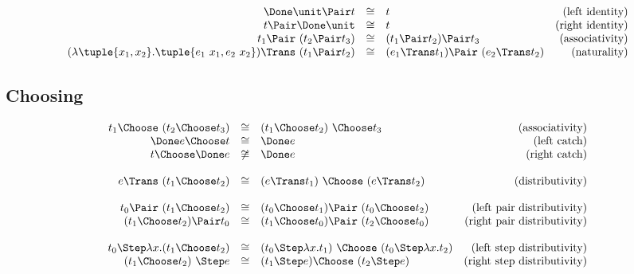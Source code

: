 \begin{equation*}
  \begin{array}{rclr}
    \Done \unit \Pair t
      &\cong& t
      & \text{(left identity)} \\
    t \Pair \Done \unit
      &\cong& t
      & \text{(right identity)} \\
    t_1 \Pair\ (t_2 \Pair t_3)
      &\cong& (t_1 \Pair t_2) \Pair t_3
      & \text{(associativity)} \\
    (\lambda \tuple{x_1, x_2}. \tuple{e_1\ x_1, e_2\ x_2}) \Trans\ (t_1 \Pair t_2)
      &\cong& (e_1 \Trans t_1) \Pair\ (e_2 \Trans t_2)
      & \text{(naturality)} \\
  \end{array}
\end{equation*}


\subsection{Choosing}

\begin{equation*}
  \begin{array}{rclr}
    t_1 \Choose\ (t_2 \Choose t_3)
      &\cong& (t_1 \Choose t_2)\ \Choose t_3
      & \text{(associativity)} \\
    \Done e \Choose t
      &\cong& \Done e
      & \text{(left catch)} \\
    t \Choose \Done e
      &\not\cong& \Done e
      & \text{(right catch)} \\
    & & & \\
    e \Trans\ (t_1 \Choose t_2)
      &\cong& (e \Trans t_1)\ \Choose\ (e \Trans t_2)
      & \text{(distributivity)} \\
    & & & \\
    t_0 \Pair\ (t_1 \Choose t_2)
      &\cong& (t_0 \Choose t_1) \Pair\ (t_0 \Choose t_2)
      & \text{(left pair distributivity)} \\
    (t_1 \Choose t_2) \Pair t_0
      &\cong& (t_1 \Choose t_0) \Pair\ (t_2 \Choose t_0)
      & \text{(right pair distributivity)} \\
    & & & \\
    t_0 \Step \lambda x. (t_1 \Choose t_2)
      &\cong& (t_0 \Step \lambda x. t_1)\ \Choose\ (t_0 \Step \lambda x. t_2)
      & \text{(left step distributivity)} \\
    (t_1 \Choose t_2)\ \Step e
      &\cong& (t_1 \Step e) \Choose\ (t_2 \Step e)
      & \text{(right step distributivity)} \\
  \end{array}
\end{equation*}

